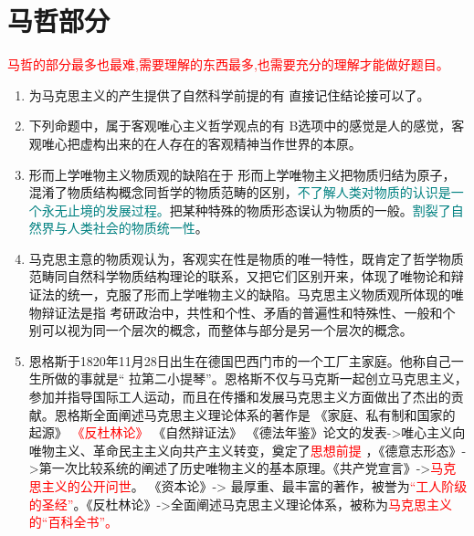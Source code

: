 \section{马哲部分}

\textcolor{red}{\faBook 马哲的部分最多也最难,需要理解的东西最多,也需要充分的理解才能做好题目。}

\begin{enumerate}[align=hang, start=1]
	\item 为马克思主义的产生提供了自然科学前提的有 
	\note 直接记住结论接可以了。
	
	
	\item 下列命题中，属于客观唯心主义哲学观点的有 
	\note B选项中的感觉是人的感觉，客观唯心把虚构出来的在人存在的客观精神当作世界的本原。
	
	
	\item 形而上学唯物主义物质观的缺陷在于
	\note 形而上学唯物主义把物质归结为原子，混淆了物质结构概念同哲学的物质范畴的区别，\textcolor{teal}{不了解人类对物质的认识是一个永无止境的发展过程。}把某种特殊的物质形态误认为物质的一般。\textcolor{teal}{割裂了自然界与人类社会的物质统一性}。
	
	
	\item 马克思主意的物质观认为，客观实在性是物质的唯一特性，既肯定了哲学物质范畴同自然科学物质结构理论的联系，又把它们区别开来，体现了唯物论和辩证法的统一，克服了形而上学唯物主义的缺陷。马克思主义物质观所体现的唯物辩证法是指
	\note 考研政治中，共性和个性、矛盾的普遍性和特殊性、一般和个别可以视为同一个层次的概念，而整体与部分是另一个层次的概念。
	
	
	\item 
	恩格斯于1820年11月28日出生在德国巴西门市的一个工厂主家庭。他称自己一生所做的事就是`` 拉第二小提琴''。恩格斯不仅与马克斯一起创立马克思主义，参加并指导国际工人运动，而且在传播和发展马克思主义方面做出了杰出的贡献。恩格斯全面阐述马克思主义理论体系的著作是 
	  {  《家庭、私有制和国家的起源》  }  {  \textcolor{red}{《反杜林论》}   }  { 《自然辩证法》   }
	\note  《德法年鉴》论文的发表->唯心主义向唯物主义、革命民主主义向共产主义转变，奠定了\textcolor{red}{思想前提} ，《德意志形态》->第一次比较系统的阐述了历史唯物主义的基本原理。《共产党宣言》->\textcolor{red}{马克思主义的公开问世}。 《资本论》-> 最厚重、最丰富的著作，被誉为\textcolor{red}{``工人阶级的圣经''}。《反杜林论》->全面阐述马克思主义理论体系，被称为\textcolor{red}{马克思主义的``百科全书''。}
	

\end{enumerate}
